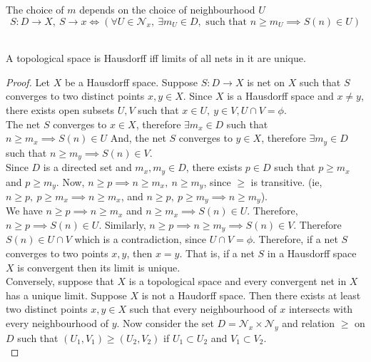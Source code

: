 \begin{remark}
\begin{commentary}
	The choice of $m$ depends on the choice of neighbourhood $U$
	\[S: D \to X,\ S \to x \iff \left( \forall U \in \mathcal{N}_x,\ \exists m_U \in D,\text{ such that } n \ge m_U \implies S(n) \in U \right)\]
\end{commentary}
\end{remark}

\begin{theorem}\cite[10.1.4]{joshi}\\
	A topological space is Hausdorff iff limits of all nets in it are unique.
\end{theorem}
\begin{proof}
	Let $X$ be a  Hausdorff space.
	Suppose $S : D \to X$ is net on $X$ such that $S$ converges to two distinct points $x,y \in X$.
	Since $X$ is a Hausdorff space and $x \ne y$, there exists open subsets $U,V$ such that $x \in U,\ y \in V, U \cap V = \phi$.\\

	The net $S$ converges to $x \in X$, therefore $\exists m_x \in D$ such that $n \ge m_x \implies S(n) \in U$
	And, the net $S$ converges to $y \in X$, therefore $\exists m_y \in D$ such that $n \ge m_y \implies S(n) \in V$.\\

	Since $D$ is a directed set and $m_x, m_y \in D$, there exists $p \in D$ such that $p \ge m_x$ and $p \ge m_y$.
	Now, $n \ge p \implies n \ge m_x,\ n \ge m_y$, since $\ge$ is transitive.
	(ie, $n \ge p,\ p \ge m_x \implies n \ge m_x$, and $n \ge p,\ p \ge m_y \implies n \ge m_y$).\\

	We have $n \ge p \implies n \ge m_x$ and $n \ge m_x \implies S(n) \in U$.
	Therefore, $n \ge p \implies S(n) \in U$.
	Similarly, $n \ge p \implies n \ge m_y \implies S(n) \in V$.
	Therefore $S(n) \in U \cap V$ which is a contradiction, since $U \cap V = \phi$.
	Therefore, if a net $S$ converges to two points $x,y$, then $x = y$.
	That is, if a net $S$ in a Hausdorff space $X$ is convergent then its limit is unique.\\

	Conversely, suppose that $X$ is a topological space and every convergent net in $X$ has a unique limit.
	Suppose $X$ is not a Haudorff space.
	Then there exists at least two distinct points $x,y \in X$ such that every neighbourhood of $x$ intersects with every neighbourhood of $y$.
	Now consider the set $D = \mathcal{N}_x \times \mathcal{N}_y$ and relation $\ge$ on $D$ such that $(U_1,V_1) \ge (U_2,V_2)$ if $U_1 \subset U_2$ and $V_1 \subset V_2$.\\



\end{proof}
